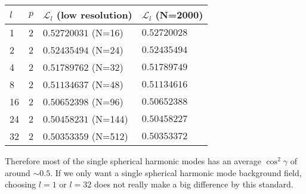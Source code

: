 \documentclass[a4paper, 11pt]{article}
\begin{document}
\begin{table}[ht]
\centering
\begin{tabular}{llll}
    \toprule
    $l$ & $p$ & $\mathcal{L}_l$ (low resolution) & $\mathcal{L}_l$ (N=2000) \\ 
    \midrule
    1 & 2 & $\mathbf{0.5272003}1$ (N=16) & $\mathbf{0.5272002}8$ \\
    2 & 2 & $\mathbf{0.52435494}$ (N=24) & $\mathbf{0.52435494}$ \\
    4 & 2 & $\mathbf{0.517897}62$ (N=32) & $\mathbf{0.517897}49$ \\
    8 & 2 & $\mathbf{0.511346}37$ (N=48) & $\mathbf{0.511346}16$ \\ 
    16 & 2 & $\mathbf{0.506523}98$ (N=96) & $\mathbf{0.506523}88$ \\ 
    24 & 2 & $\mathbf{0.5045823}1$ (N=144) & $\mathbf{0.5045822}7$ \\
    32 & 2 & $\mathbf{0.503533}59$ (N=512) & $\mathbf{0.503533}72$ \\
    \bottomrule
\end{tabular}
\end{table}

Therefore most of the single spherical harmonic modes has an average $\cos^2\gamma$ of around $\sim 0.5$. If we only want a single spherical harmonic mode background field, choosing $l=1$ or $l=32$ does not really make a big difference by this standard.
\end{document}
